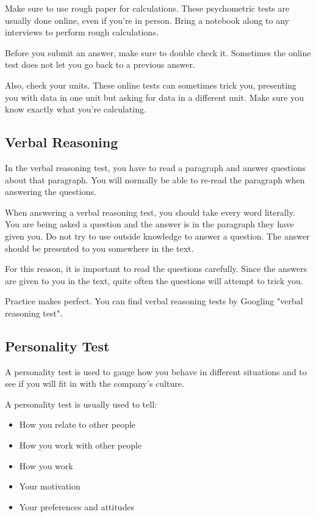 \documentclass{article}
\begin{document}
Make sure to use rough paper for calculations. These psychometric tests
are usually done online, even if you're in person. Bring a notebook
along to any interviews to perform rough calculations.

Before you submit an answer, make sure to double check it. Sometimes the
online test does not let you go back to a previous answer.

Also, check your units. These online tests can sometimes trick you,
presenting you with data in one unit but asking for data in a different
unit. Make sure you know exactly what you're calculating.
\subsection{Verbal Reasoning}
In the verbal reasoning test, you have to read a paragraph and answer
questions about that paragraph. You will normally be able to re-read the
paragraph when answering the questions.

When answering a verbal reasoning test, you should take every word
literally. You are being asked a question and the answer is in the
paragraph they have given you. Do not try to use outside knowledge to
answer a question. The answer should be presented to you somewhere in
the text.

For this reason, it is important to read the questions carefully. Since
the answers are given to you in the text, quite often the questions will
attempt to trick you.

Practice makes perfect. You can find verbal reasoning tests by Googling
"verbal reasoning test".
\subsection{Personality Test}
A personality test is used to gauge how you behave in different
situations and to see if you will fit in with the company's culture.

A personality test is usually used to tell:

\begin{itemize}
\item
  How you relate to other people
\item
  How you work with other people
\item
  How you work
\item
  Your motivation
\item
  Your preferences and attitudes
\end{itemize}
\end{document}
